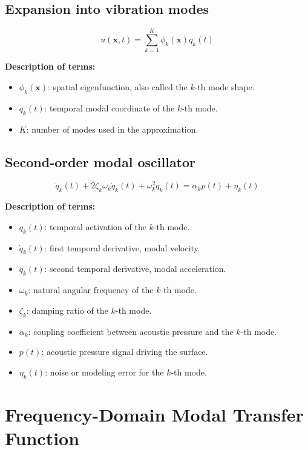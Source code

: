 \documentclass[11pt]{article}
\begin{document}
\subsection{Expansion into vibration modes}

\begin{equation}
u(\bm{x},t)
=
\sum_{k=1}^{K}
\phi_k(\bm{x}) q_k(t)
\end{equation}

\textbf{Description of terms:}

\begin{itemize}
    \item $\phi_k(\bm{x})$: spatial eigenfunction, also called the $k$-th mode shape.
    \item $q_k(t)$: temporal modal coordinate of the $k$-th mode.
    \item $K$: number of modes used in the approximation.
\end{itemize}

\subsection{Second-order modal oscillator}

\begin{equation}
\ddot{q}_k(t)
+
2\zeta_k \omega_k \dot{q}_k(t)
+
\omega_k^2 q_k(t)
=
\alpha_k p(t)
+
\eta_k(t)
\end{equation}

\textbf{Description of terms:}

\begin{itemize}
    \item $q_k(t)$: temporal activation of the $k$-th mode.
    \item $\dot{q}_k(t)$: first temporal derivative, modal velocity.
    \item $\ddot{q}_k(t)$: second temporal derivative, modal acceleration.
    \item $\omega_k$: natural angular frequency of the $k$-th mode.
    \item $\zeta_k$: damping ratio of the $k$-th mode.
    \item $\alpha_k$: coupling coefficient between acoustic pressure and the $k$-th mode.
    \item $p(t)$: acoustic pressure signal driving the surface.
    \item $\eta_k(t)$: noise or modeling error for the $k$-th mode.
\end{itemize}

\section{Frequency-Domain Modal Transfer Function}
\end{document}
